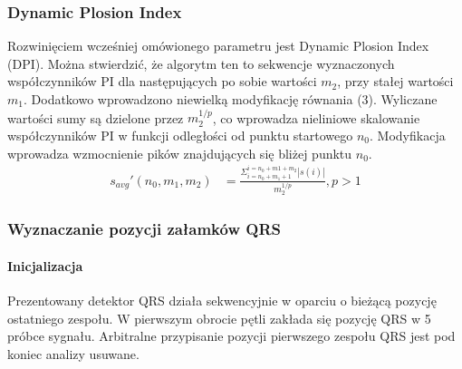 \documentclass[10pt,a4paper]{article}
\begin{document}
\subsubsection{Dynamic Plosion Index}
Rozwinięciem wcześniej omówionego parametru jest Dynamic Plosion Index (DPI). Można stwierdzić, że algorytm ten to sekwencje wyznaczonych współczynników PI dla następujących po sobie wartości $m_2$, przy stałej wartości $m_1$. Dodatkowo wprowadzono niewielką modyfikację równania (3). Wyliczane wartości sumy są dzielone przez $m_2^{1/p}$, co wprowadza nieliniowe skalowanie współczynników PI w funkcji odległości od punktu startowego $n_0$. Modyfikacja wprowadza wzmocnienie pików znajdujących się bliżej punktu $n_0$.
\begin{align}
 s_{avg}'(n_0,m_1,m_2) &= \frac{\Sigma_{i=n_0+m_1+1}^{i=n_0+m1+m_2}|s(i)|}{m_2^{1/p}}, p>1
\end{align}

\subsubsection{Wyznaczanie pozycji załamków QRS}
\paragraph{Inicjalizacja}
Prezentowany detektor QRS działa sekwencyjnie w oparciu o bieżącą pozycję ostatniego zespołu. W pierwszym obrocie pętli zakłada się pozycję QRS w 5 próbce sygnału. Arbitralne przypisanie pozycji pierwszego zespołu QRS jest pod koniec analizy usuwane. 
\end{document}

